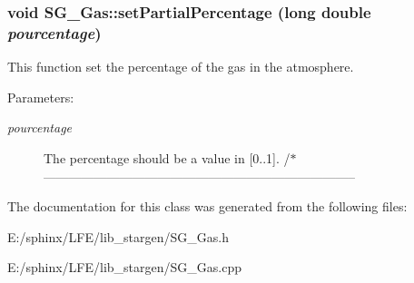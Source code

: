 \subsubsection{\setlength{\rightskip}{0pt plus 5cm}void SG\_\-Gas::set\-Partial\-Percentage (long double {\em pourcentage})}\label{class_s_g___gas_a21}


This function set the percentage of the gas in the atmosphere. 

\begin{Desc}
\item[Parameters:]
\begin{description}
\item[{\em pourcentage}]The percentage should be a value in [0..1]. /$\ast$-------------------------------------------------------------------------- \end{description}
\end{Desc}


The documentation for this class was generated from the following files:\begin{CompactItemize}
\item 
E:/sphinx/LFE/lib\_\-stargen/SG\_\-Gas.h\item 
E:/sphinx/LFE/lib\_\-stargen/SG\_\-Gas.cpp\end{CompactItemize}
